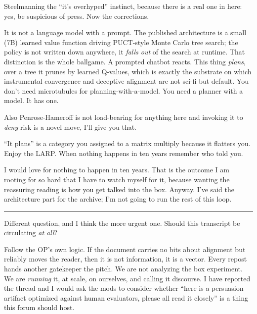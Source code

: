\begin{wtbthread}

Steelmanning the ``it's overhyped'' instinct, because there is a real one in here: yes, be suspicious of press. Now the corrections.

It is not a language model with a prompt. The published architecture is a small (7B) learned value function driving PUCT-style Monte Carlo tree search; the policy is not written down anywhere, it \emph{falls out} of the search at runtime. That distinction is the whole ballgame. A prompted chatbot reacts. This thing \emph{plans}, over a tree it prunes by learned Q-values, which is exactly the substrate on which instrumental convergence and deceptive alignment are not sci-fi but default. You don't need microtubules for planning-with-a-model. You need a planner with a model. It has one.

Also Penrose-Hameroff is not load-bearing for anything here and invoking it to \emph{deny} risk is a novel move, I'll give you that.

\begin{wtbthread}

``It plans'' is a category you assigned to a matrix multiply because it flatters you. Enjoy the LARP. When nothing happens in ten years remember who told you.
\end{wtbthread}

\begin{wtbthread}

I would love for nothing to happen in ten years. That is the outcome I am rooting for so hard that I have to watch myself for it, because wanting the reassuring reading is how you get talked into the box. Anyway. I've said the architecture part for the archive; I'm not going to run the rest of this loop.
\end{wtbthread}
\end{wtbthread}

\begin{center}\rule{0.3\linewidth}{0.4pt}\end{center}


Different question, and I think the more urgent one. Should this transcript be circulating \emph{at all}?

Follow the OP's own logic. If the document carries no bits about alignment but reliably moves the reader, then it is not information, it is a vector. Every repost hands another gatekeeper the pitch. We are not analyzing the box experiment. We are \emph{running} it, at scale, on ourselves, and calling it discourse. I have reported the thread and I would ask the mods to consider whether ``here is a persuasion artifact optimized against human evaluators, please all read it closely'' is a thing this forum should host.

